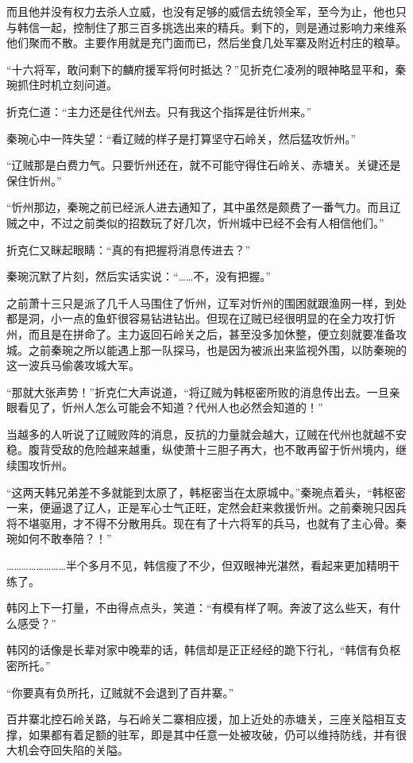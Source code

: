 而且他并没有权力去杀人立威，也没有足够的威信去统领全军，至今为止，他也只与韩信一起，控制住了那三百多挑选出来的精兵。剩下的，则是通过影响力来维系他们聚而不散。主要作用就是充门面而已，然后坐食几处军寨及附近村庄的粮草。

“十六将军，敢问剩下的麟府援军将何时抵达？”见折克仁凌冽的眼神略显平和，秦琬抓住时机立刻问道。

折克仁道：“主力还是往代州去。只有我这个指挥是往忻州来。”

秦琬心中一阵失望：“看辽贼的样子是打算坚守石岭关，然后猛攻忻州。”

“辽贼那是白费力气。只要忻州还在，就不可能守得住石岭关、赤塘关。关键还是保住忻州。”

“忻州那边，秦琬之前已经派人进去通知了，其中虽然是颇费了一番气力。而且辽贼之中，不过之前类似的招数玩了好几次，忻州城中已经不会有人相信他们。”

折克仁又眯起眼睛：“真的有把握将消息传进去？”

秦琬沉默了片刻，然后实话实说：“……不，没有把握。”

之前萧十三只是派了几千人马围住了忻州，辽军对忻州的围困就跟渔网一样，到处都是洞，小一点的鱼虾很容易钻进钻出。但现在辽贼已经很明显的在全力攻打忻州，而且是在拼命了。主力返回石岭关之后，甚至没多加休整，便立刻就要准备攻城。之前秦琬之所以能遇上那一队探马，也是因为被派出来监视外围，以防秦琬的这一波兵马偷袭攻城大军。

“那就大张声势！”折克仁大声说道，“将辽贼为韩枢密所败的消息传出去。一旦亲眼看见了，忻州人怎么可能会不知道？代州人也必然会知道的！”

当越多的人听说了辽贼败阵的消息，反抗的力量就会越大，辽贼在代州也就越不安稳。腹背受敌的危险越来越重，纵使萧十三胆子再大，也不敢再留于忻州境内，继续围攻忻州。

“这两天韩兄弟差不多就能到太原了，韩枢密当在太原城中。”秦琬点着头，“韩枢密一来，便逼退了辽人，正是军心士气正旺，定然会赶来救援忻州。之前秦琬只因兵将不堪驱用，才不得不分散用兵。现在有了十六将军的兵马，也就有了主心骨。秦琬如何不敢奉陪？！”

……………………半个多月不见，韩信瘦了不少，但双眼神光湛然，看起来更加精明干练了。

韩冈上下一打量，不由得点点头，笑道：“有模有样了啊。奔波了这么些天，有什么感受？”

韩冈的话像是长辈对家中晚辈的话，韩信却是正正经经的跪下行礼，“韩信有负枢密所托。”

“你要真有负所托，辽贼就不会退到了百井寨。”

百井寨北控石岭关路，与石岭关二寨相应援，加上近处的赤塘关，三座关隘相互支撑，如果都有着足额的驻军，即是其中任意一处被攻破，仍可以维持防线，并有很大机会夺回失陷的关隘。

